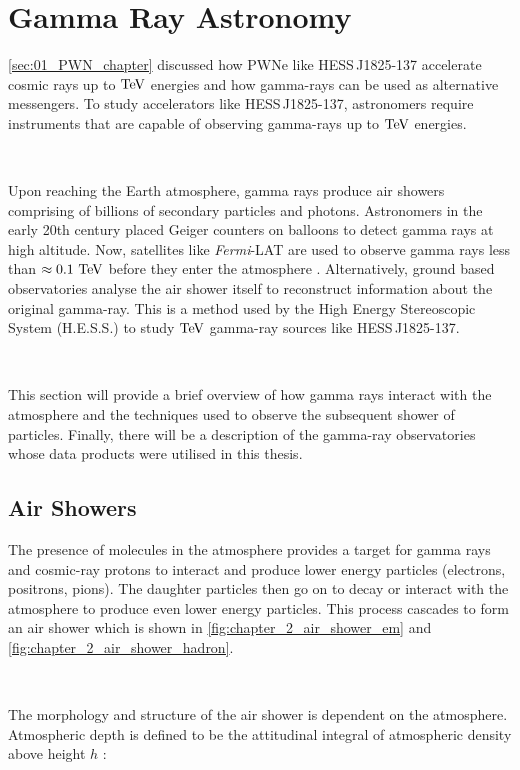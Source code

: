 \chapter{Gamma Ray Astronomy} \label{sec:02_astronomy}

\autoref{sec:01_PWN_chapter} discussed how PWNe like \mbox{HESS\,J1825-137} accelerate cosmic rays up to $\TeV$ energies and how gamma-rays can be used as alternative messengers. To study accelerators like \mbox{HESS\,J1825-137}, astronomers require instruments that are capable of observing gamma-rays up to $\TeV$ energies.
\par~\par 
Upon reaching the Earth atmosphere, gamma rays produce air showers comprising of billions of secondary particles and photons. Astronomers in the early 20th century placed Geiger counters on balloons to detect gamma rays at high altitude. Now, satellites like \textit{Fermi}-LAT are used to observe gamma rays less than $\approx 0.1~\TeV$ before they enter the atmosphere \citep{2010RPPh...73g4901M}. Alternatively, ground based observatories analyse the air shower itself to reconstruct information about the original gamma-ray. This is a method used by the High Energy Stereoscopic System (H.E.S.S.) to study $\TeV$ gamma-ray sources like \mbox{HESS\,J1825-137}.
\par~\par 
This section will provide a brief overview of how gamma rays interact with the atmosphere and the techniques used to observe the subsequent shower of particles. Finally, there will be a description of the gamma-ray observatories whose data products were utilised in this thesis.%

\section{Air Showers}

The presence of molecules in the atmosphere provides a target for gamma rays and cosmic-ray protons to interact and produce lower energy particles (electrons, positrons, pions). The daughter particles then go on to decay or interact with the atmosphere to produce even lower energy particles. This process cascades to form an air shower which is shown in \autoref{fig:chapter_2_air_shower_em} and \autoref{fig:chapter_2_air_shower_hadron}.
\par~\par 
The morphology and structure of the air shower is dependent on the atmosphere. Atmospheric depth is defined to be the attitudinal integral of atmospheric density above height $h$ \citep{alma9924446790001811}:

